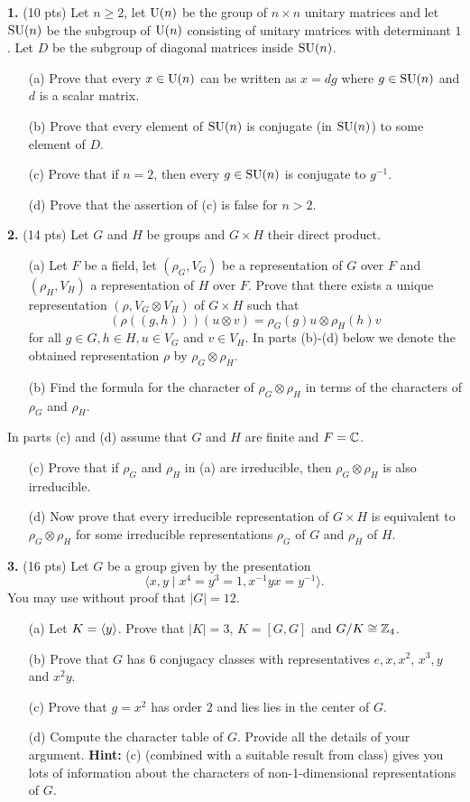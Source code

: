\documentclass[12pt]{amsart}
\begin{document}
\skv
{\bf 1.} (10 pts) Let $n\geq 2$, let ${\rm U}(n)$ be the group
of $n\times n$ unitary matrices and let
${\rm SU}(n)$ be the subgroup of ${\rm U}(n)$ consisting of unitary matrices with determinant $1$.
Let $D$ be the subgroup of diagonal matrices inside ${\rm SU}(n)$.
\begin{itemize} 
\item[(a)] Prove that every $x\in {\rm U}(n)$ can be written
as $x=dg$ where $g\in {\rm SU}(n)$ and $d$ is a scalar matrix. 
\item[(b)] Prove that every element of ${\rm SU}(n)$ is conjugate (in ${\rm SU}(n)$) to some element of $D$.
\item[(c)] Prove that if $n=2$, then every $g\in {\rm SU}(n)$ is conjugate to $g^{-1}$.
\item[(d)] Prove that the assertion of (c) is false for $n>2$.
\end{itemize}
\skv
{\bf 2.} (14 pts) Let $G$ and $H$ be groups and $G\times H$ their direct product.
\begin{itemize}
\item[(a)] Let $F$ be a field, let $(\rho_G,V_G)$ be a representation of $G$ over $F$ and $(\rho_H,V_H)$ a representation of $H$ over $F$. Prove that there exists a unique representation $(\rho, V_G\otimes V_H)$
of $G\times H$ such that $$(\rho((g,h)))(u\otimes v)=\rho_G(g)u\otimes \rho_H(h)v$$ for all $g\in G,h\in H,
u\in V_G$ and $v\in V_H$. In parts (b)-(d) below we denote the obtained representation $\rho$
by $\rho_G\otimes \rho_H$.
\item[(b)] Find the formula for the character of $\rho_G\otimes \rho_H$ in terms of the characters of $\rho_G$ and $\rho_H$.
\end{itemize}
In parts (c) and (d) assume that $G$ and $H$ are finite and $F={\mathbb C}$. 
\begin{itemize}
\item[(c)] Prove that if $\rho_G$ and $\rho_H$ in (a) are irreducible, then $\rho_G\otimes \rho_H$ is also irreducible. 
\item[(d)] Now prove that every irreducible representation of $G\times H$ is equivalent to $\rho_G\otimes \rho_H$ for some irreducible representations $\rho_G$ of $G$ and $\rho_H$ of $H$.
\end{itemize}
\skv
{\bf 3.} (16 pts) Let $G$ be a group given by the presentation $$\langle x,y\mid x^4=y^3=1, x^{-1}yx=y^{-1}\rangle.$$
You may use without proof that $|G|=12$.
\begin{itemize}
\item[(a)] Let $K={\langle} y{\rangle}$. Prove that $|K|=3$, $K=[G,G]$
and $G/K\cong {\mathbb Z}_4$.
\item[(b)] Prove that $G$ has $6$ conjugacy classes with representatives $e,x,x^2$, $x^3,y$ and $x^2 y$.
\item[(c)] Prove that $g=x^2$ has order $2$ and lies
lies in the center of $G$.
\item[(d)] Compute the character table of $G$. Provide all the details of your argument. {\bf Hint:} (c) (combined with a suitable
result from class) gives you lots of information about the characters of non-1-dimensional representations of $G$.
\end{itemize}
\end{document}
